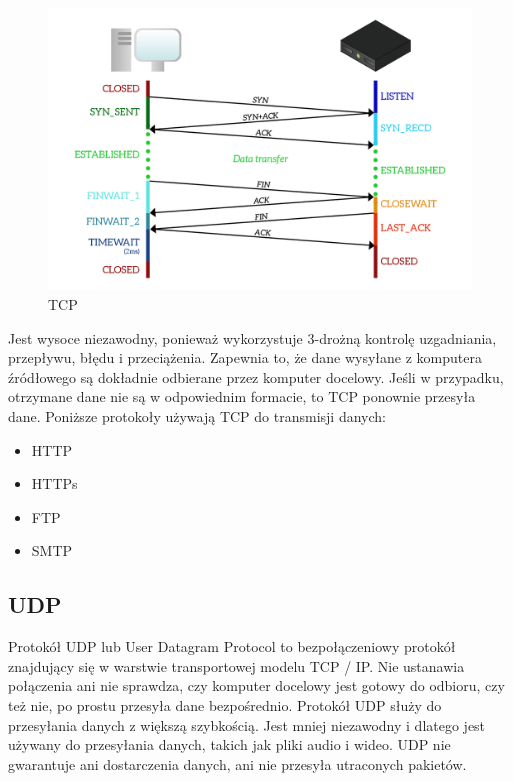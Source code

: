\documentclass[a4paper,12pt,oneside]{book}
\begin{document}
		\begin{figure}[h!]
			\centering\includegraphics[scale=0.35]{tcp.png}
			\caption{TCP}
		\end{figure}
		
		Jest wysoce niezawodny, ponieważ wykorzystuje 3-drożną kontrolę uzgadniania, przepływu, błędu i przeciążenia. Zapewnia to, że dane wysyłane z komputera źródłowego są dokładnie odbierane przez komputer docelowy. Jeśli w przypadku, otrzymane dane nie są w odpowiednim formacie, to TCP ponownie przesyła dane.
		Poniższe protokoły używają TCP do transmisji danych:
		\begin{itemize}
			\item HTTP
			\item HTTPs
			\item FTP
			\item SMTP
		\end{itemize}
		
		\subsection*{UDP}
		
		Protokół UDP lub User Datagram Protocol to bezpołączeniowy protokół znajdujący się w warstwie transportowej modelu TCP / IP. Nie ustanawia połączenia ani nie sprawdza, czy komputer docelowy jest gotowy do odbioru, czy też nie, po prostu przesyła dane bezpośrednio. Protokół UDP służy do przesyłania danych z większą szybkością. Jest mniej niezawodny i dlatego jest używany do przesyłania danych, takich jak pliki audio i wideo.
		UDP nie gwarantuje ani dostarczenia danych, ani nie przesyła utraconych pakietów.
		
\end{document}
